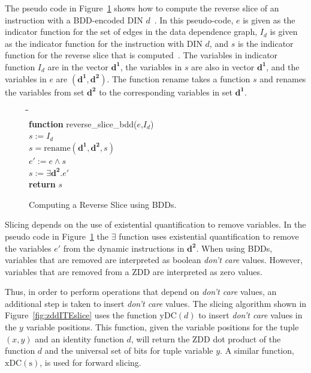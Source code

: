 \documentclass[defaultstyle,11pt]{thesis}
\begin{document}
The pseudo code in Figure~\ref{fig:bddslice} shows how to compute the
reverse slice of an instruction with a BDD-encoded DIN
$d$~\cite{price:06:cal}.  In this pseudo-code, $e$ is given as the
indicator function for the set of edges in the data dependence graph,
$I_d$ is given as the indicator function for the instruction with DIN
$d$, and $s$ is the indicator function for the reverse slice that is
computed~\cite{price:06:cal}.  The variables in indicator function
$I_d$ are in the vector $\mathbf{d^1}$, the variables in $s$ are also
in vector $\mathbf{d^1}$, and the variables in $e$ are
$(\mathbf{d^1},\mathbf{d^2})$.  The function $\mathrm{rename}$ takes a
function $s$ and renames the variables from set $\mathbf{d^2}$ to the
corresponding variables in set $\mathbf{d^1}$.

\begin{figure}
\begin{center}
\begin{minipage}{1.5in}
\begin{tabbing}
\hspace{1em}\=\hspace{1em}\=\hspace{1em}\=\hspace{1em}\=\\
\textbf{function} reverse\_slice\_bdd($e$,$I_d$)\\
\>$s := I_d$\\
\>$s = \mathrm{rename}(\mathbf{d^1},\mathbf{d^2},s)$\\
\>$e' := e \land s$\\
\>$s := \exists \mathbf{d^2}.e'$\\
\>\textbf{return} $s$
\end{tabbing}
\end{minipage}
\end{center}
\caption{Computing a Reverse Slice using BDDs.~\cite{price:06:cal}}
\label{fig:bddslice}
\end{figure}

Slicing depends on the use of existential quantification to remove
variables. In the pseudo code in Figure~\ref{fig:bddslice} the
$\exists$ function uses existential quantification to remove the
variables $e'$ from the dynamic instructions in $\mathbf{d^2}$.  When
using BDDs, variables that are removed are interpreted as boolean
\textit{don't care} values.  However, variables that are removed from
a ZDD are interpreted as zero values.

Thus, in order to perform operations that depend on \textit{don't
  care} values, an additional step is taken to insert \textit{don't
  care} values.  The slicing algorithm shown in
Figure~\ref{fig:zddITEslice} uses the function $\mathrm{yDC}(d)$ to
insert \textit{don't care} values in the $y$ variable positions.  This
function, given the variable positions for the tuple $(x,y)$ and an
identity function $d$, will return the ZDD dot
product\cite{mishchenko:01:sc} of the function $d$ and the universal
set of bits for tuple variable $y$.  A similar function,
$\mathrm{xDC(s)}$, is used for forward slicing.
\end{document}
